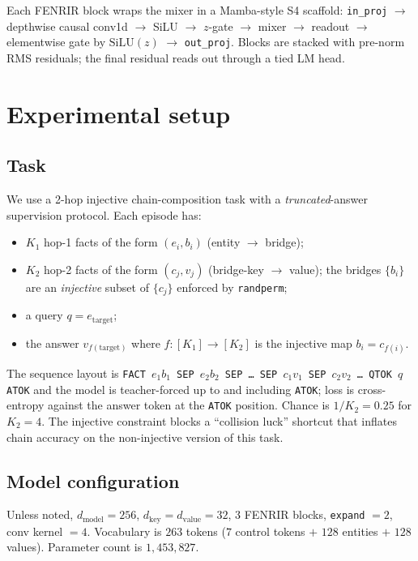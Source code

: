 \documentclass[11pt]{article}
\newcommand{\claim}[1]{#1}
\begin{document}
Each FENRIR block wraps the mixer in a Mamba-style S4 scaffold:
\texttt{in\_proj} $\to$ depthwise causal conv1d $\to$ SiLU $\to$
$z$-gate $\to$ mixer $\to$ readout $\to$ elementwise gate by
$\mathrm{SiLU}(z)$ $\to$ \texttt{out\_proj}. Blocks are stacked with
pre-norm RMS residuals; the final residual reads out through a tied LM
head.

\section{Experimental setup}
\label{sec:setup}

\subsection{Task}
\label{sec:setup:task}

We use a 2-hop injective chain-composition task with a
\emph{truncated}-answer supervision protocol. Each episode has:
\begin{itemize}
\item $K_1$ hop-1 facts of the form $(e_i, b_i)$ (entity $\to$ bridge);
\item $K_2$ hop-2 facts of the form $(c_j, v_j)$ (bridge-key $\to$
      value); the bridges $\{b_i\}$ are an \emph{injective} subset of
      $\{c_j\}$ enforced by \texttt{randperm};
\item a query $q = e_{\text{target}}$;
\item the answer $v_{f(\text{target})}$ where $f: [K_1] \to [K_2]$ is
      the injective map $b_i = c_{f(i)}$.
\end{itemize}

The sequence layout is
\texttt{FACT $e_1 b_1$ SEP $e_2 b_2$ SEP \dots\ SEP $c_1 v_1$ SEP
$c_2 v_2$ \dots\ QTOK $q$ ATOK} and the model is teacher-forced up to
and including \texttt{ATOK}; loss is cross-entropy against the answer
token at the \texttt{ATOK} position. Chance is $1 / K_2 = 0.25$ for
$K_2 = 4$. The injective constraint blocks a ``collision luck'' shortcut
that inflates chain accuracy on the non-injective version of this task.

\subsection{Model configuration}

Unless noted, $d_{\text{model}} = 256$, $d_{\text{key}} = d_{\text{value}} = 32$,
$3$ FENRIR blocks, \texttt{expand} $= 2$, conv kernel $= 4$. Vocabulary is
\claim{$263$ tokens} ($7$ control tokens $+$ $128$ entities $+$ $128$
values). Parameter count is \claim{$1{,}453{,}827$}.
\end{document}
